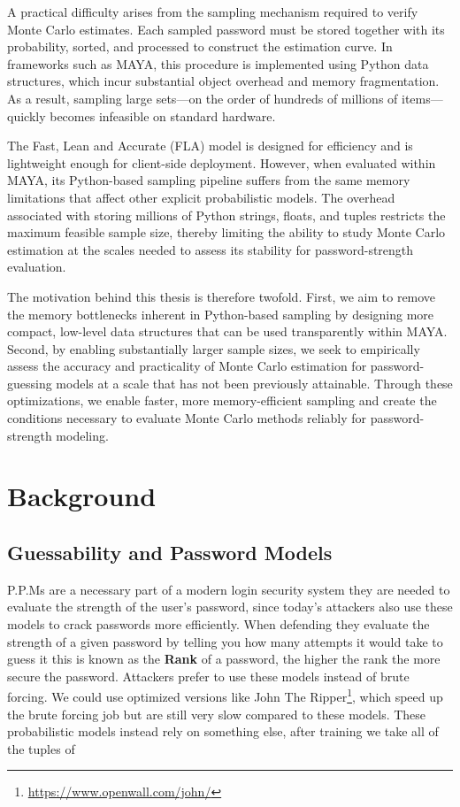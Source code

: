 \documentclass[english,noexaminfo,a4paper,oneside, binding = 0.6cm]{sapthesis}
\begin{document}
A practical difficulty arises from the sampling mechanism required to verify Monte Carlo estimates. Each sampled password must be stored together with its probability, sorted, and processed to construct the estimation curve. In frameworks such as MAYA, this procedure is implemented using Python data structures, which incur substantial object overhead and memory fragmentation. As a result, sampling large sets—on the order of hundreds of millions of items—quickly becomes infeasible on standard hardware.

The Fast, Lean and Accurate (FLA) model is designed for efficiency and is lightweight enough for client-side deployment. However, when evaluated within MAYA, its Python-based sampling pipeline suffers from the same memory limitations that affect other explicit probabilistic models. The overhead associated with storing millions of Python strings, floats, and tuples restricts the maximum feasible sample size, thereby limiting the ability to study Monte Carlo estimation at the scales needed to assess its stability for password-strength evaluation.

The motivation behind this thesis is therefore twofold. First, we aim to remove the memory bottlenecks inherent in Python-based sampling by designing more compact, low-level data structures that can be used transparently within MAYA. Second, by enabling substantially larger sample sizes, we seek to empirically assess the accuracy and practicality of Monte Carlo estimation for password-guessing models at a scale that has not been previously attainable. Through these optimizations, we enable faster, more memory-efficient sampling and create the conditions necessary to evaluate Monte Carlo methods reliably for password-strength modeling.
\chapter{Background }
\label{chap:3} 
\section{Guessability and Password Models}
P.P.Ms are a necessary part of a modern login security system they are needed to evaluate the strength of the user's password,
since today's attackers also use these models to crack passwords more efficiently.
When defending they evaluate the strength of a given password by telling you how many attempts it would take to guess it this is known as the \textbf{ Rank } of a password, the higher the rank the more secure the password.
Attackers prefer to use these models instead of brute forcing.
We could use optimized versions like John The Ripper\footnote{\url{https://www.openwall.com/john/}}, which speed up the brute forcing job but are still very slow compared to these models.
These probabilistic models instead rely on something else, after training we take all of the tuples of 
\end{document}
